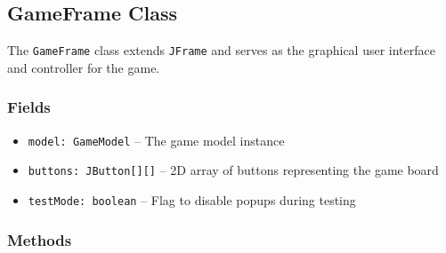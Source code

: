 \documentclass[12pt,a4paper]{article}
\begin{document}
\subsection{GameFrame Class}

The \texttt{GameFrame} class extends \texttt{JFrame} and serves as the graphical user interface and controller for the game.

\subsubsection{Fields}
\begin{itemize}
    \item \texttt{model: GameModel} -- The game model instance
    \item \texttt{buttons: JButton[][]} -- 2D array of buttons representing the game board
    \item \texttt{testMode: boolean} -- Flag to disable popups during testing
\end{itemize}

\subsubsection{Methods}
\end{document}
